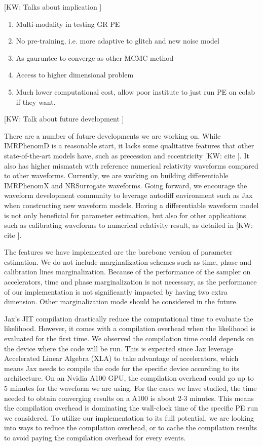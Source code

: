 \documentclass[twocolumn]{aastex631}
\newcommand{\kw}[1]{{\color{rb4}[KW: #1 ]}}
\begin{document}
\kw{Talks about implication}
\begin{enumerate}
    \item Multi-modality in testing GR PE
    \item No pre-training, i.e. more adaptive to glitch and new noise model
    \item As gauruntee to converge as other MCMC method
    \item Access to higher dimensional problem
    \item Much lower computational cost, allow poor institute to just run PE on colab if they want.
\end{enumerate}

\kw{Talk about future development}

There are a number of future developments we are working on.
While IMRPhenomD is a reasonable start, it lacks some qualitative features that other state-of-the-art models have,
such as precession and eccentricity \kw{cite}.
It also has higher mismatch with reference numerical relativity waveforms compared to other waveforms.
Currently, we are working on building differentiable IMRPhenomX and NRSurrogate waveforms.
Going forward, we encourage the waveform development community to leverage autodiff environment such as Jax when constructing new waveform models.
Having a differentiable waveform model is not only beneficial for parameter estimation, but also for other applications such as calibrating waveforms to numerical relativity result, as detailed in \kw{cite}.

The features we have implemented are the barebone version of parameter estimation.
We do not include marginalization schemes such as time, phase and calibration lines marginalization.
Because of the performance of the sampler on accelerators, time and phase marginalization is not necessary,
as the performance of our implementation is not significantly impacted by having two extra dimension.
Other marginalization mode should be considered in the future.

Jax's JIT compilation drastically reduce the computational time to evaluate the likelihood.
However, it comes with a compilation overhead when the likelihood is evaluated for the first time.
We observed the compilation time could depends on the device where the code will be run.
This is expected since Jax leverage Accelerated Linear Algebra (XLA) to take advantage of accelerators,
which means Jax needs to compile the code for the specific device according to its architecture.
On an Nvidia A100 GPU, the compilation overhead could go up to 5 minutes for the waveform we are using.
For the cases we have studied, the time needed to obtain converging results on a A100 is about 2-3 minutes.
This means the compilation overhead is dominating the wall-clock time of the specific PE run we considered.
To utilize our implementation to its full potential, we are looking into ways to reduce the compilation overhead,
or to cache the compilation results to avoid paying the compilation overhead for every events.
\end{document}
